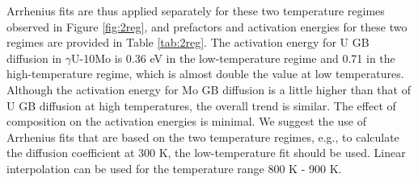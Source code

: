 \documentclass{elsarticle}
\providecommand{\DIFadd}[1]{{\protect\color{blue} \sf #1}} %
\providecommand{\DIFdel}[1]{}
\providecommand{\DIFaddbegin}{} %
\providecommand{\DIFaddend}{} %
\providecommand{\DIFdelbegin}{} %
\providecommand{\DIFdelend}{} %
\begin{document}
Arrhenius fits are thus applied separately for these two temperature regimes observed in Figure \ref{fig:2reg}, and prefactors and activation energies for these two regimes are provided in \DIFdelbegin \DIFdel{Tables \ref{tab:compArrHigh} and \ref{tab:compArrLow}}\DIFdelend \DIFaddbegin \DIFadd{Table \ref{tab:2reg}}\DIFaddend . The activation energy for \DIFdelbegin \DIFdel{total GB diffusion is 0.457 eV for U-10Mo at high temperatures}\DIFdelend \DIFaddbegin \DIFadd{U GB diffusion in $\gamma$U-10Mo is 0.36 eV in the low-temperature regime and 0.71 in the high-temperature regime}\DIFaddend , which is \DIFdelbegin \DIFdel{3.4 times higher than the activation energy at low temperatures(0.135 eV). }\DIFdelend \DIFaddbegin \DIFadd{almost double the value at low temperatures. Although the activation energy for Mo GB diffusion is a little higher than that of U GB diffusion at high temperatures, the overall trend is similar. The effect of composition on the activation energies is minimal. }\DIFaddend We suggest the use of Arrhenius fits that are based on the two temperature regimes, e.g., to calculate the diffusion coefficient at 300 K, the low-temperature fit should be used. \DIFaddbegin \DIFadd{Linear interpolation can be used for the temperature range 800 K - 900 K.
}\DIFaddend 
\end{document}
